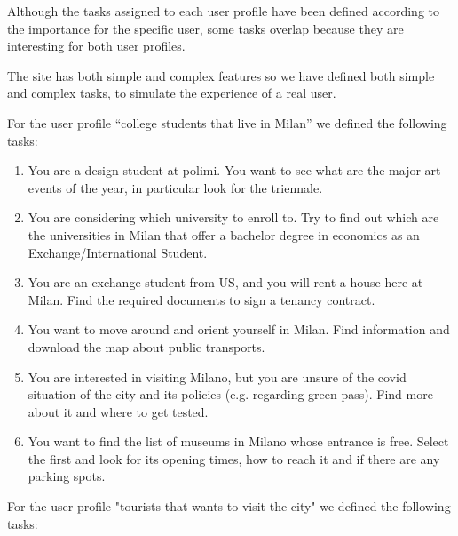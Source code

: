    Although the tasks assigned to each user profile have been defined according to the importance for the specific user, some tasks overlap because they are interesting for both user profiles.

    The site has both simple and complex features so we have defined both simple and complex tasks, to simulate the experience of a real user.
    
    For the user profile ``college students that live in Milan'' we defined the following tasks:

    \begin{enumerate}
        
        \item You are a design student at polimi. You want to see what are the major art events of the year, in particular look for the triennale.
        \item You are considering which university to enroll to. Try to find out which are the universities in Milan that offer a bachelor degree in economics as an Exchange/International Student.
        \item You are an exchange student from US, and you will rent a house here at Milan. Find the required documents to sign a tenancy contract.
        \item You want to move around and orient yourself in Milan. Find information and download the map about public transports.
        \item You are interested in visiting Milano, but you are unsure of the covid situation of the city and its policies (e.g. regarding green pass). Find more about it and where to get tested.
        \item You want to find the list of museums in Milano whose entrance is free. Select the first and look for its opening times, how to reach it and if there are any parking spots. 
    \end{enumerate}
        For the user profile "tourists that wants to visit the city" we defined the following tasks:
